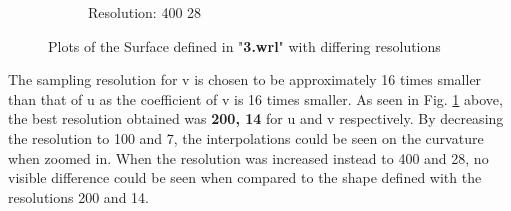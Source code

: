 \documentclass[acmlarge,nonacm=true]{acmart}
\begin{document}
\begin{figure}[H]
\begin{subfigure}{.33\textwidth}
		\caption{Resolution: 400 28}
	  \end{subfigure}
	\caption{Plots of the Surface defined in "\textbf{3.wrl}" with differing resolutions}
	\label{fig:3}
\end{figure}

The sampling resolution for v is chosen to be approximately 16 times smaller than that of u as the coefficient of v is 
16 times smaller. As seen in Fig. \ref{fig:3} above, the best resolution obtained was \textbf{200, 14} for u and v respectively.
By decreasing the resolution to 100 and 7, the interpolations could be seen on the curvature when zoomed in. When the resolution was increased
instead to 400 and 28, no visible difference could be seen when compared to the shape defined with the resolutions 200 and 14.


\newpage
\end{document}
